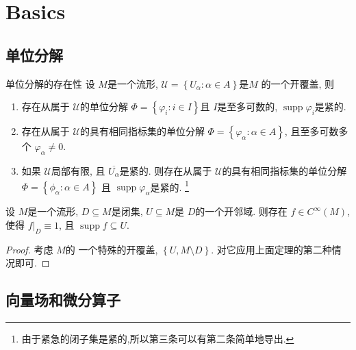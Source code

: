 \documentclass[../main.tex]{subfiles}
\begin{document}
\chapter{Basics}

\section{单位分解}

\begin{theorem}{单位分解的存在性}{}
    设 \(  M  \)是一个流形, \(  \mathscr{U}= \left\{ U_{\alpha }: \alpha \in A \right\}  \)是\(  M  \)   的一个开覆盖, 则
    \begin{enumerate}
        \item 存在从属于 \(  \mathscr{U}  \)的单位分解 \(  \Phi  = \left\{  \varphi _{i}: i \in I \right\}  \)且 \(  I  \)是至多可数的, \(  \operatorname{supp} \varphi _{i}  \)是紧的. 
        \item     存在从属于 \(  \mathscr{U}  \)的具有相同指标集的单位分解 \(  \Phi = \left\{  \varphi _{\alpha } :\alpha \in A\right\}  \), 且至多可数多个 \(   \varphi _{\alpha }\neq 0  \).      
        \item 如果 \(  \mathscr{U}  \)局部有限, 且 \(  \overline{U_{\alpha }}  \)是紧的. 则存在从属于 \(  \mathscr{U}  \)的具有相同指标集的单位分解 \(  \Phi = \left\{ \phi _{\alpha }: \alpha \in A \right\}  \)    且 \(  \operatorname{supp} \varphi _{\alpha }  \)是紧的.  \footnote{由于紧急的闭子集是紧的,所以第三条可以有第二条简单地导出. }
    \end{enumerate}
    
\end{theorem}


\begin{corollary}{}{}
    设 \(  M  \)是一个流形, \(  D\subseteq M  \)是闭集,  \(  U\subseteq M  \)是 \(  D  \)的一个开邻域. 则存在 \(  f \in C^{\infty}\left( M \right)   \), 使得 \(  \left. f \right|_{D} \equiv 1  \), 且 \(  \operatorname{supp}f \subseteq U  \).       
\end{corollary}

\begin{proof}
    考虑 \(  M  \)的 一个特殊的开覆盖,  \(  \left\{ U, M\setminus D \right\}  \). 对它应用上面定理的第二种情况即可. 
\end{proof}

\section{向量场和微分算子}
\end{document}
